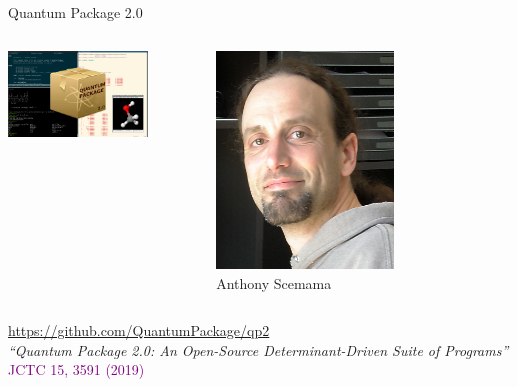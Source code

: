 \documentclass[aspectratio=169,9pt]{beamer}
\newcommand{\pub}[1]{{\small \textcolor{purple}{#1}}}
\begin{document}
\begin{frame}{Quantum Package 2.0}
        \begin{columns}
                \begin{column}{0.80\textwidth}
                    \centering
                    \includegraphics[width=0.75\textwidth]{fig/TOC_QP2}
                \end{column}
                \begin{column}{0.20\textwidth}
                        \centering
                        \includegraphics[width=0.6\textwidth]{fig/Anthony}
                        \\
                        Anthony Scemama
                \end{column}
        \end{columns}
        \centering
        \bigskip
    	\url{https://github.com/QuantumPackage/qp2}
        \\
        \bigskip
        {\em ``Quantum Package 2.0: An Open-Source Determinant-Driven Suite of Programs''}\\
        \bigskip
	\pub{JCTC 15, 3591 (2019)}
\end{frame}
\end{document}
